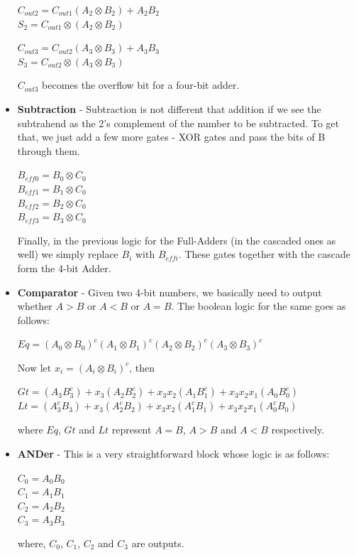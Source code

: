 \documentclass[a4paper, titlepage]{article}
\begin{document}
\begin{itemize}
\begin{center}
        $C_{out2} = C_{out1}(A_2\otimes B_2) + A_2B_2$ \\
        $S_2 = C_{out1}\otimes (A_2\otimes B_2)$

        $C_{out3} = C_{out2}(A_3\otimes B_3) + A_3B_3$ \\
        $S_3 = C_{out2}\otimes (A_3\otimes B_3)$
    \end{center}
    $C_{out3}$ becomes the overflow bit for a four-bit adder.
    \item \textbf{Subtraction} - Subtraction is not different that addition if we see the subtrahend as the 2's complement 
    of the number to be subtracted. To get that, we just add a few more gates - XOR gates and pass the bits of B through them.
    \begin{center}
        $B_{eff0} = B_0\otimes C_0$\\
        $B_{eff1} = B_1\otimes C_0$\\
        $B_{eff2} = B_2\otimes C_0$\\
        $B_{eff3} = B_3\otimes C_0$
    \end{center}
    Finally, in the previous logic for the Full-Adders (in the cascaded ones as well) we simply replace $B_i$ with $B_{effi}$. 
    These gates together with the cascade form the 4-bit Adder.
    \item \textbf{Comparator} - Given two 4-bit numbers, we basically need to output whether $A>B$ or $A<B$ or $A=B$. The 
    boolean logic for the same goes as follows:
    \begin{center}
        $Eq = (A_0\otimes B_0)^c(A_1\otimes B_1)^c(A_2\otimes B_2)^c(A_3\otimes B_3)^c$
    \end{center} 
    Now let $x_i = (A_i\otimes B_i)^c$, then 
    \begin{center}
        $Gt = (A_3B_3^c) + x_3(A_2B_2^c) + x_3x_2(A_1B_1^c) + x_3x_2x_1(A_0B_0^c)$
        $Lt = (A_3^cB_3) + x_3(A_2^cB_2) + x_3x_2(A_1^cB_1) + x_3x_2x_1(A_0^cB_0)$
    \end{center}
    where $Eq$, $Gt$ and $Lt$ represent $A=B$, $A>B$ and $A<B$ respectively.
    \item \textbf{ANDer} - This is a very straightforward block whose logic is as follows:
    \begin{center}
        $C_0 = A_0B_0$\\
        $C_1 = A_1B_1$\\
        $C_2 = A_2B_2$\\
        $C_3 = A_3B_3$
    \end{center}
    where, $C_0$, $C_1$, $C_2$ and $C_3$ are outputs.
\end{itemize}
\end{document}
